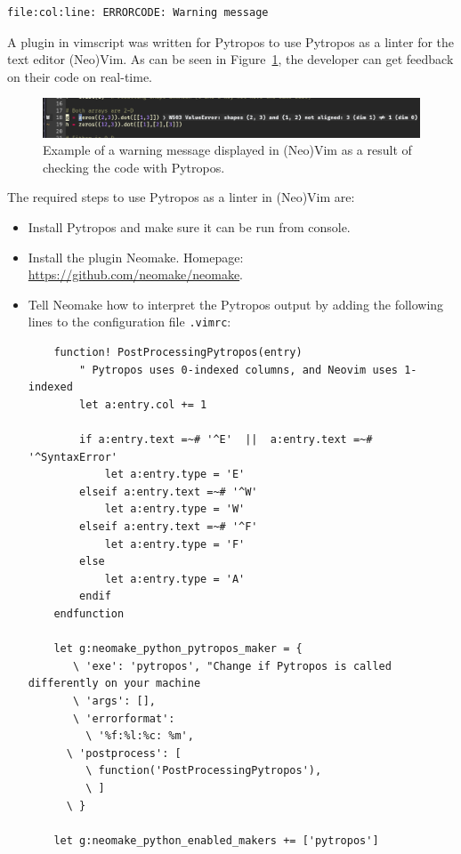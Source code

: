 \begin{verbatim}
file:col:line: ERRORCODE: Warning message
\end{verbatim}

A plugin in vimscript was written for Pytropos to use Pytropos as a linter for the text
editor (Neo)Vim. As can be seen in Figure~\ref{pytroposlinter}, the developer can get
feedback on their code on real-time.

\begin{figure}
\includegraphics[width=\textwidth]{figures/neovim-linter.png}
\caption{Example of a warning message displayed in (Neo)Vim as a result of checking the code
  with Pytropos.\label{pytroposlinter}}
\end{figure}

The required steps to use Pytropos as a linter in (Neo)Vim are:

\begin{itemize}
\tightlist
\item Install Pytropos and make sure it can be run from console.
\item Install the plugin Neomake. Homepage: \url{https://github.com/neomake/neomake}.
\item Tell Neomake how to interpret the Pytropos output by adding the following lines to
  the configuration file \verb|.vimrc|:
  \begin{verbatim}
    function! PostProcessingPytropos(entry)
        " Pytropos uses 0-indexed columns, and Neovim uses 1-indexed
        let a:entry.col += 1

        if a:entry.text =~# '^E'  ||  a:entry.text =~# '^SyntaxError'
            let a:entry.type = 'E'
        elseif a:entry.text =~# '^W'
            let a:entry.type = 'W'
        elseif a:entry.text =~# '^F'
            let a:entry.type = 'F'
        else
            let a:entry.type = 'A'
        endif
    endfunction

    let g:neomake_python_pytropos_maker = {
       \ 'exe': 'pytropos', "Change if Pytropos is called differently on your machine
       \ 'args': [],
       \ 'errorformat':
         \ '%f:%l:%c: %m',
      \ 'postprocess': [
         \ function('PostProcessingPytropos'),
         \ ]
      \ }

    let g:neomake_python_enabled_makers += ['pytropos']
  \end{verbatim}
\end{itemize}

